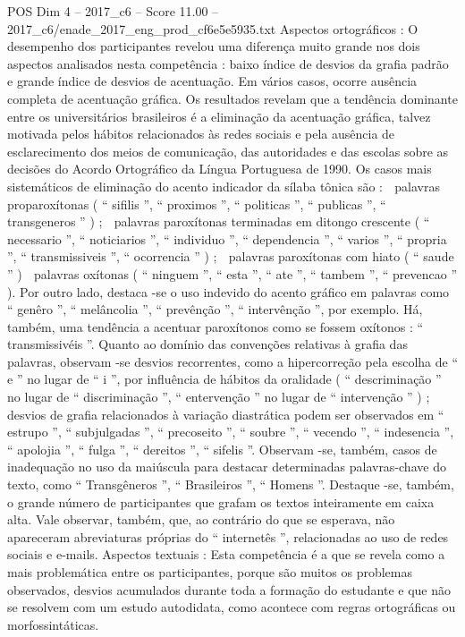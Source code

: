 \begin{textsample}{POS Dim 4 – 2017\_c6 – Score 11.00 – 2017\_c6/enade\_2017\_eng\_prod\_cf6e5e5935.txt}
Aspectos ortográficos : O desempenho dos participantes revelou uma diferença muito grande nos dois aspectos analisados nesta competência : baixo índice de desvios da grafia padrão e grande índice de desvios de acentuação.
Em vários casos, ocorre ausência completa de acentuação gráfica.
Os resultados revelam que a tendência dominante entre os universitários brasileiros é a eliminação da acentuação gráfica, talvez motivada pelos hábitos relacionados às redes sociais e pela ausência de esclarecimento dos meios de comunicação, das autoridades e das escolas sobre as decisões do Acordo Ortográfico da Língua Portuguesa de 1990.
Os casos mais sistemáticos de eliminação do acento indicador da sílaba tônica são :  palavras proparoxítonas ( “ sifilis ”, “ proximos ”, “ politicas ”, “ publicas ”, “ transgeneros ” ) ;  palavras paroxítonas terminadas em ditongo crescente ( “ necessario ”, “ noticiarios ”, “ individuo ”, “ dependencia ”, “ varios ”, “ propria ”, “ transmissiveis ”, “ ocorrencia ” ) ;  palavras paroxítonas com hiato ( “ saude ” )  palavras oxítonas ( “ ninguem ”, “ esta ”, “ ate ”, “ tambem ”, “ prevencao ” ).
Por outro lado, destaca -se o uso indevido do acento gráfico em palavras como “ genêro ”, “ melâncolia ”, “ prevênção ”, “ intervênção ”, por exemplo.
Há, também, uma tendência a acentuar paroxítonos como se fossem oxítonos : “ transmissivéis ”.
Quanto ao domínio das convenções relativas à grafia das palavras, observam -se desvios recorrentes, como a hipercorreção pela escolha de “ e ” no lugar de “ i ”, por influência de hábitos da oralidade ( “ descriminação ” no lugar de “ discriminação ”, “ entervenção ” no lugar de “ intervenção ” ) ; desvios de grafia relacionados à variação diastrática podem ser observados em “ estrupo ”, “ subjulgadas ”, “ precoseito ”, “ soubre ”, “ vecendo ”, “ indesencia ”, “ apolojia ”, “ fulga ”, “ dereitos ”, “ sifelis ”.
Observam -se, também, casos de inadequação no uso da maiúscula para destacar determinadas palavras-chave do texto, como “ Transgêneros ”, “ Brasileiros ”, “ Homens ”.
Destaque -se, também, o grande número de participantes que grafam os textos inteiramente em caixa alta.
Vale observar, também, que, ao contrário do que se esperava, não apareceram abreviaturas próprias do “ internetês ”, relacionadas ao uso de redes sociais e e-mails.
Aspectos textuais : Esta competência é a que se revela como a mais problemática entre os participantes, porque são muitos os problemas observados, desvios acumulados durante toda a formação do estudante e que não se resolvem com um estudo autodidata, como acontece com regras ortográficas ou morfossintáticas.

\end{textsample}
